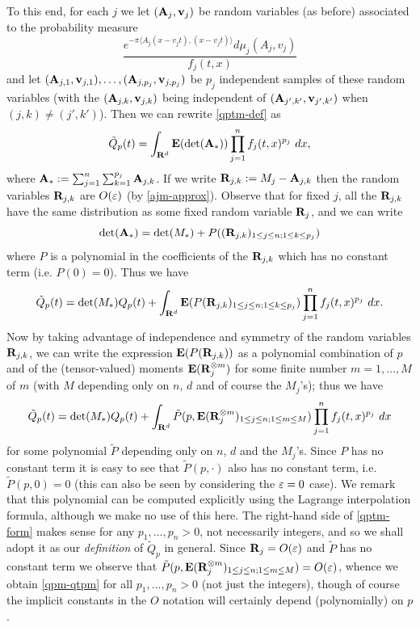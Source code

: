 To this end, for each $j$ we let $({\hbox{\bf A}}_j, {\hbox{\bf v}}_j)$ be random
variables (as before) associated to the probability measure
$$ \frac{e^{-\pi \langle A_j(x-v_{j}t), (x-v_{j}t)
\rangle}d\mu_{j}(A_{j},v_{j})}{f_j(t,x)}$$ and let $({\hbox{\bf A}}_{j,1},
{\hbox{\bf v}}_{j,1}), \ldots, ({\hbox{\bf A}}_{j,p_j}, {\hbox{\bf v}}_{j,p_j})$ be $p_j$ independent
samples of these random variables (with the $({\hbox{\bf A}}_{j,k}, {\hbox{\bf v}}_{j,k})$
being independent of $({\hbox{\bf A}}_{j',k'}, {\hbox{\bf v}}_{j',k'})$ when $(j,k) \neq
(j',k')$).  Then we can rewrite \eqref{qptm-def} as
$$
 \tilde Q_p(t) = \int_{{\bf R}^d}
{\hbox{\bf E}}(\det({\hbox{\bf A}}_*)) \prod_{j=1}^n f_j(t,x)^{p_j}\ dx,
$$
where ${\hbox{\bf A}}_* := \sum_{j=1}^n \sum_{k=1}^{p_j} {\hbox{\bf A}}_{j,k}$.  If we
write ${\hbox{\bf R}}_{j,k} := M_j - {\hbox{\bf A}}_{j,k}$ then the random variables
${\hbox{\bf R}}_{j,k}$ are $O(\varepsilon)$ (by \eqref{ajm-approx}).
Observe that for fixed $j$, all the ${\hbox{\bf R}}_{j,k}$ have the same
distribution as some fixed random variable ${\hbox{\bf R}}_j$, and we can
write
$$ \det({\hbox{\bf A}}_*) = \det(M_*) + P( ({\hbox{\bf R}}_{j,k})_{1 \leq j \leq n;
1 \leq k \leq p_j} )$$ where $P$ is a polynomial in the
coefficients of the ${\hbox{\bf R}}_{j,k}$ which has no constant term (i.e.
$P(0) = 0$).  Thus we have
$$ \tilde Q_p(t) = \det(M_*) Q_p(t) +
\int_{{\bf R}^d} {\hbox{\bf E}}(P({\hbox{\bf R}}_{j,k})_{1 \leq j \leq n; 1 \leq k \leq
p_j}) \prod_{j=1}^n f_j(t,x)^{p_j}\ dx.$$ Now by taking advantage
of independence and symmetry of the random variables ${\hbox{\bf R}}_{j,k}$,
we can write the expression ${\hbox{\bf E}}(P({\hbox{\bf R}}_{j,k}))$ as a polynomial
combination of $p$ and of the (tensor-valued) moments
${\hbox{\bf E}}({\hbox{\bf R}}_j^{\otimes m})$ for some finite number $m=1,\ldots,M$ of
$m$ (with $M$ depending only on $n$, $d$ and of course the
$M_{j}$'s); thus we have
\begin{equation}\label{qptm-form}  \tilde Q_p(t) = \det(M_*) Q_p(t) +
\int_{{\bf R}^d} \tilde P(p, {\hbox{\bf E}}({\hbox{\bf R}}_{j}^{\otimes m})_{1 \leq j \leq
n; 1 \leq m \leq M}) \prod_{j=1}^n f_j(t,x)^{p_j}\ dx
\end{equation}
for some polynomial $\tilde P$ depending only on $n$, $d$ and the
$M_{j}$'s. Since $P$ has no constant term it is easy to see that
$\tilde P(p, \cdot)$ also has no constant term, i.e. $\tilde
P(p,0) = 0$ (this can also be seen by considering the $\varepsilon=0$
case). We remark that this polynomial can be computed explicitly
using the Lagrange interpolation formula, although we make no use
of this here.
The right-hand side of \eqref{qptm-form} makes sense for any
$p_1,\hdots,p_n>0$, not necessarily integers, and so we shall
adopt it as our \emph{definition} of $\tilde Q_p$ in general. Since ${\hbox{\bf R}}_j
= O(\varepsilon)$ and $\tilde P$ has no constant term we observe that
$\tilde P(p, {\hbox{\bf E}}({\hbox{\bf R}}_{j}^{\otimes m})_{1 \leq j \leq n; 1 \leq m
\leq M}) = O(\varepsilon)$, whence we obtain \eqref{qpm-qtpm} for all
$p_1,\hdots,p_n
> 0$ (not just the integers), though of course the implicit
constants in the $O$ notation will certainly depend (polynomially)
on $p$.

